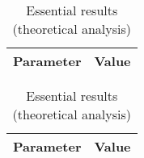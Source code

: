 \newpage

\begin{table}[!htb]
  \begin{minipage}{.5\linewidth}
     \centering
  \begin{tabular}{|c|c|}
    \hline    
    {\bf Parameter} & {\bf Value} \\ \hline
    
    
 \end{tabular}
 \caption{Essentia lresults (simulation analysis)}
 \label{tab:sim}
  \end{minipage}
    \hspace{2 mm}
    \begin{minipage}{.5\linewidth}
      \centering
        \begin{tabular}{|c|c|}
    \hline    
    {\bf Parameter} & {\bf Value} \\ \hline
    
    
 \end{tabular}
        \caption{Essential results (theoretical analysis)}
        \label{tab:compsim}
    \end{minipage} 
\end{table}


